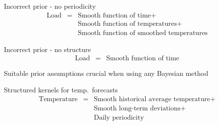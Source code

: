 \begin{frame}{Incorrect prior - no periodicity}
    \begin{eqnarray*}
    \textrm{Load} & = & \textrm{Smooth function of time} +  \\
    & & \textrm{Smooth function of temperatures} + \\
    & & \textrm{Smooth function of smoothed temperatures}
  \end{eqnarray*}
  \begin{center}
    
  \end{center}
\end{frame}

\begin{frame}{Incorrect prior - no structure}
  \vspace{-1\baselineskip}
    \begin{eqnarray*}
    \textrm{Load} & = & \textrm{Smooth function of time}
  \end{eqnarray*}
  \begin{center}
    
  \end{center}
  Suitable prior assumptions crucial when using any Bayesian method
\end{frame}

\begin{frame}{Structured kernels for temp.\ forecasts}
  \begin{eqnarray*}
    \textrm{Temperature} & = & \textrm{Smooth historical average temperature} +  \\
    & & \textrm{Smooth long-term deviations} + \\
    & & \textrm{Daily periodicity}
  \end{eqnarray*}
  \begin{center}
    
  \end{center}
\end{frame}

